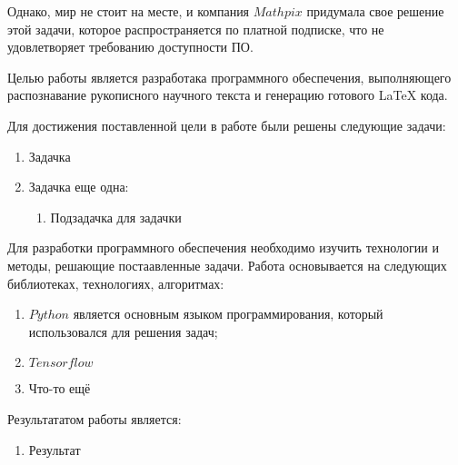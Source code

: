 Однако, мир не стоит на месте, и компания $Mathpix$ придумала свое решение \cite{mathpix} этой задачи, которое распространяется по платной подписке, что не удовлетворяет требованию доступности ПО.

Целью работы является разработака программного обеспечения, выполняющего распознавание рукописного научного текста и  генерацию готового LaTeX кода.

Для достижения поставленной цели в работе были решены следующие задачи:
\begin{enumerate}
    \item Задачка
    \item Задачка еще одна:
        \begin{enumerate}
            \item Подзадачка для задачки
        \end{enumerate}
\end{enumerate}

Для разработки программного обеспечения необходимо изучить технологии и методы, решающие постаавленные задачи. Работа основывается на следующих библиотеках, технологиях, алгоритмах:
\begin{enumerate}
    \item $Python$ является основным языком программирования, который использовался для решения задач;
    \item $Tensorflow$
    \item Что-то ещё
\end{enumerate}

Результататом работы является:
\begin{enumerate}
    \item Результат
\end{enumerate}